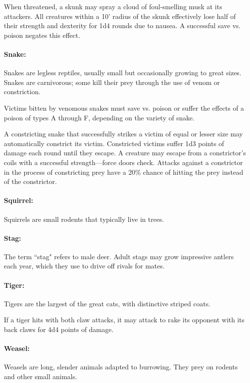 \begin{multicols}{2}
When threatened, a skunk may spray a cloud of foul-smelling musk at its attackers. All creatures within a 10' radius of the skunk effectively lose half of their strength and dexterity for 1d4 rounds due to nausea. A successful save vs. poison negates this effect.

\paragraph{Snake:} Snakes are legless reptiles, usually small but occasionally growing to great sizes. Snakes are carnivorous; some kill their prey through the use of venom or constriction.

Victims bitten by venomous snakes must save vs. poison or suffer the effects of a poison of types A through F, depending on the variety of snake.

A constricting snake that successfully strikes a victim of equal or lesser size may automatically constrict its victim. Constricted victims suffer 1d3 points of damage each round until they escape. A creature may escape from a constrictor's coils with a successful strength---force doors check. Attacks against a constrictor in the process of constricting prey have a 20\% chance of hitting the prey instead of the constrictor.

\paragraph{Squirrel:} Squirrels are small rodents that typically live in trees.

\paragraph{Stag:} The term ``stag" refers to male deer. Adult stags may grow impressive antlers each year, which they use to drive off rivals for mates.

\paragraph{Tiger:} Tigers are the largest of the great cats, with distinctive striped coats.

If a tiger hits with both claw attacks, it may attack to rake its opponent with its back claws for 4d4 points of damage.

\paragraph{Weasel:} Weasels are long, slender animals adapted to burrowing. They prey on rodents and other small animals.


\end{multicols}
